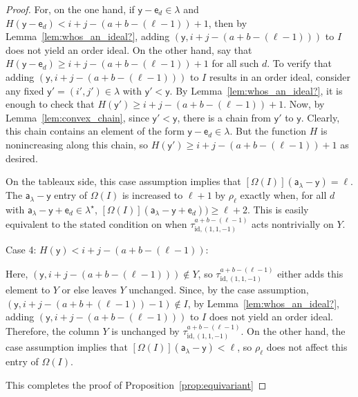 \documentclass[12pt]{amsart}
\newcommand{\y}{\ensuremath{\mathsf{y}}}
\newcommand{\e}{\ensuremath{\mathsf{e}}}
\newcommand{\aaa}{\ensuremath{\mathsf{a}}}
\theoremstyle{definition}
\theoremstyle{remark}
\numberwithin{equation}{section}
\begin{document}
\begin{proof}
For, on the one hand, if $\y-\e_d \in \lambda$ and $H(\y-\e_d) < i+j-(a+b-(\ell-1))+1$, then by Lemma~\ref{lem:whos_an_ideal?}, adding $(\y,i+j-(a+b-(\ell-1)))$ to $I$ does not yield an order ideal. 
On the other hand, say that $H(\y-\e_d) \geq i+j-(a+b-(\ell-1))+1$ for all such $d$. To verify that adding $(\y,i+j-(a+b-(\ell-1)))$ to $I$ results in an order ideal, consider any fixed $\y' = (i',j') \in \lambda$ with $\y' < \y$. By Lemma~\ref{lem:whos_an_ideal?}, it is enough to check that $H(\y') \geq i+j-(a+b-(\ell-1))+1$. 
Now, by Lemma~\ref{lem:convex_chain}, since $\y' < \y$, there is a chain from $\y'$ to $\y$. Clearly, this chain contains an element of the form $\y-\e_d \in \lambda$. But the function $H$ is nonincreasing along this chain, so $H(\y') \geq i+j-(a+b-(\ell-1))+1$ as desired.

On the tableaux side, this case assumption implies that $[\Omega(I)](\aaa_\lambda - \y) = \ell$. The $\aaa_\lambda - \y$ entry of $\Omega(I)$ is increased to $\ell+1$ by $\rho_\ell$ exactly when, for all $d$ with $\aaa_\lambda - \y +\e_d \in \lambda^\star$, $[\Omega(I)](\aaa_\lambda - \y + \e_d)) \geq \ell+2$. This is easily equivalent to the stated condition on when $\tau^{a+b-(\ell-1)}_{\mathrm{id},(1,1,-1)}$ acts nontrivially on $Y$.

\medskip
\noindent
{\sf Case 4: $H(\y) < i+j-(a+b-(\ell-1))$:} 

Here, $(\y,i+j-(a+b-(\ell-1))) \notin Y$, so $\tau^{a+b-(\ell-1)}_{\mathrm{id},(1,1,-1)}$ either adds this element to $Y$ or else leaves $Y$ unchanged. Since, by the case assumption, $(\y,i+j-(a+b+(\ell-1))-1) \notin I$, by Lemma~\ref{lem:whos_an_ideal?}, adding $(\y,i+j-(a+b-(\ell-1)))$ to $I$ does not yield an order ideal. Therefore, the column $Y$ is unchanged by $\tau^{a+b-(\ell-1)}_{\mathrm{id},(1,1,-1)}$. On the other hand, the case assumption implies that $[\Omega(I)](\aaa_\lambda - \y) < \ell$, so $\rho_\ell$ does not affect this entry of $\Omega(I)$. 

\medskip
This completes the proof of Proposition~\ref{prop:equivariant}
\end{proof}
\end{document}
